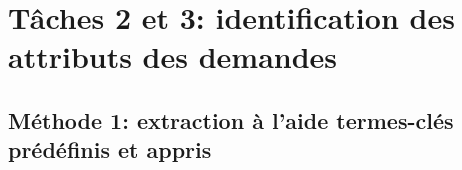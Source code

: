 \section{Tâches 2 et 3: identification des attributs des demandes}
\label{sec:quanta:attributs}

\subsection{Méthode 1: extraction à l'aide termes-clés prédéfinis et appris}
\label{subsec:quanta:attributs:règles}


